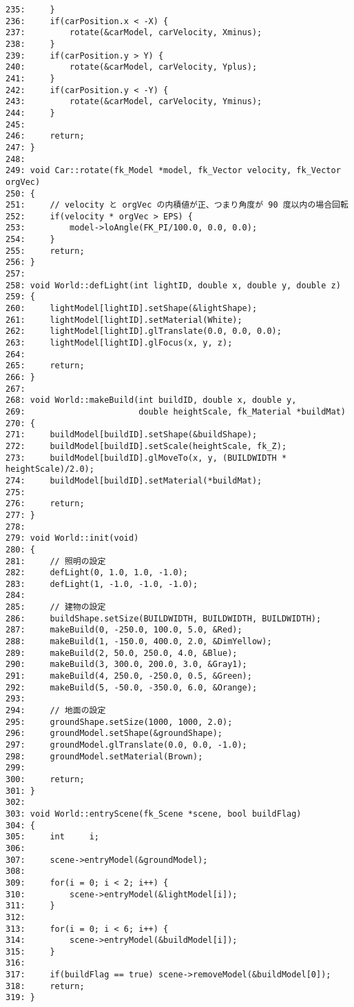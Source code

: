 \begin{breakbox}
\begin{verbatim}
235:     }
236:     if(carPosition.x < -X) {
237:         rotate(&carModel, carVelocity, Xminus);
238:     }
239:     if(carPosition.y > Y) {
240:         rotate(&carModel, carVelocity, Yplus);
241:     }
242:     if(carPosition.y < -Y) {
243:         rotate(&carModel, carVelocity, Yminus);
244:     }
245: 
246:     return;
247: }
248: 
249: void Car::rotate(fk_Model *model, fk_Vector velocity, fk_Vector orgVec)
250: {
251:     // velocity と orgVec の内積値が正、つまり角度が 90 度以内の場合回転
252:     if(velocity * orgVec > EPS) {
253:         model->loAngle(FK_PI/100.0, 0.0, 0.0);
254:     }
255:     return;
256: }
257: 
258: void World::defLight(int lightID, double x, double y, double z)
259: {
260:     lightModel[lightID].setShape(&lightShape);
261:     lightModel[lightID].setMaterial(White);
262:     lightModel[lightID].glTranslate(0.0, 0.0, 0.0);
263:     lightModel[lightID].glFocus(x, y, z);
264: 
265:     return;
266: }
267: 
268: void World::makeBuild(int buildID, double x, double y,
269:                       double heightScale, fk_Material *buildMat)
270: {
271:     buildModel[buildID].setShape(&buildShape);
272:     buildModel[buildID].setScale(heightScale, fk_Z);
273:     buildModel[buildID].glMoveTo(x, y, (BUILDWIDTH * heightScale)/2.0);
274:     buildModel[buildID].setMaterial(*buildMat);
275: 
276:     return;
277: }
278: 
279: void World::init(void)
280: {
281:     // 照明の設定
282:     defLight(0, 1.0, 1.0, -1.0);
283:     defLight(1, -1.0, -1.0, -1.0);
284: 
285:     // 建物の設定
286:     buildShape.setSize(BUILDWIDTH, BUILDWIDTH, BUILDWIDTH);
287:     makeBuild(0, -250.0, 100.0, 5.0, &Red);
288:     makeBuild(1, -150.0, 400.0, 2.0, &DimYellow);
289:     makeBuild(2, 50.0, 250.0, 4.0, &Blue); 
290:     makeBuild(3, 300.0, 200.0, 3.0, &Gray1); 
291:     makeBuild(4, 250.0, -250.0, 0.5, &Green);
292:     makeBuild(5, -50.0, -350.0, 6.0, &Orange);
293: 
294:     // 地面の設定
295:     groundShape.setSize(1000, 1000, 2.0);
296:     groundModel.setShape(&groundShape);
297:     groundModel.glTranslate(0.0, 0.0, -1.0);
298:     groundModel.setMaterial(Brown);
299: 
300:     return;
301: }
302: 
303: void World::entryScene(fk_Scene *scene, bool buildFlag)
304: {
305:     int     i;
306: 
307:     scene->entryModel(&groundModel);
308: 
309:     for(i = 0; i < 2; i++) {
310:         scene->entryModel(&lightModel[i]);
311:     }
312: 
313:     for(i = 0; i < 6; i++) {
314:         scene->entryModel(&buildModel[i]);
315:     }
316: 
317:     if(buildFlag == true) scene->removeModel(&buildModel[0]);
318:     return;
319: }
\end{verbatim}
\end{breakbox}
